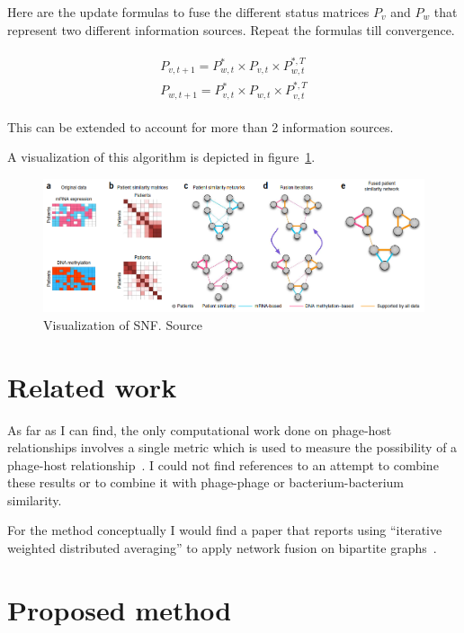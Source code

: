 \documentclass{article}
\begin{document}
Here are the update formulas to fuse the different status matrices $P_v$ and $P_w$ that 
represent two different information sources. Repeat the formulas till convergence.

\begin{align} \label{eq:update}
    \begin{split}
        P_{v, t+1} = P^*_{w, t} \times P_{v, t} \times P^{*,T}_{w, t} \\
        P_{w, t+1} = P^*_{v, t} \times P_{w, t} \times P^{*,T}_{v, t}
    \end{split}
\end{align}

This can be extended to account for more than 2 information sources.

A visualization of this algorithm is depicted in figure~\ref{fig:sim}.

\begin{figure}[ht]
    \centering
    \includegraphics[width=1\textwidth]{img/sim.png}
    \caption{Visualization of SNF. Source~\cite{wang2014similarity}}\label{fig:sim}
\end{figure}

\section{Related work}

As far as I can find, the only computational work done on phage-host relationships 
involves a single metric which is used to measure the possibility of a phage-host relationship~\cite{edwards2016computational}.
I could not find references to an attempt to combine these results or to combine
it with phage-phage or bacterium-bacterium similarity.

For the method conceptually I would find a paper that reports using ``iterative weighted distributed averaging''
to apply network fusion on bipartite graphs~\cite{khan2007distributed}.

\section{Proposed method}
\end{document}
